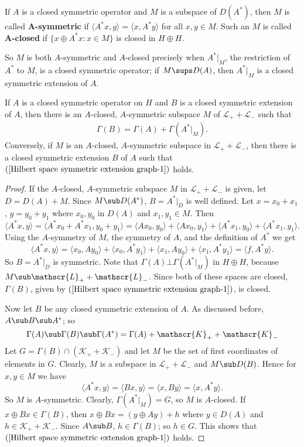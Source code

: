 \begin{definition}
If $A$ is a closed symmetric operator and $M$ is a subspace of $D(A^*)$, then $M$ is called \textbf{$\bm{A}$-symmetric} if $\langle A^*x,g\rangle=\langle x,A^*y\rangle$ for all $x,y\in M$. Such an $M$ is called \textbf{$\bm{A}$-closed} if $\{x\oplus A^*x:x\in M\}$ is closed in $H\oplus H$.
\end{definition}
So $M$ is both $A$-symmetric and $A$-closed precisely when $A^*|_M$, the restriction of $A^*$ to $M$, is a closed symmetric operator; if $M\sups D(A)$, then $A^*|_M$ is a closed symmetric extension of $A$.
\begin{proposition}\label{Hilbert space symmetric extension graph}
If $A$ is a closed symmetric operator on $H$ and $B$ is a closed symmetric extension of $A$, then there is an $A$-closed, $A$-symmetric subspace $M$ of $\mathscr{L}_++\mathscr{L}_-$ such that
\begin{align}\label{Hilbert space symmetric extension graph-1}
\Gamma(B)=\Gamma(A)+\Gamma(A^*|_{M}).
\end{align}
Conversely, if $M$ is an $A$-closed, $A$-symmetric subspace in $\mathscr{L}_++\mathscr{L}_-$, then there is a closed symmetric extension $B$ of $A$ such that $(\ref{Hilbert space symmetric extension graph-1})$ holds.
\end{proposition}
\begin{proof}
If the $A$-closed, $A$-symmetric subspace $M$ in $\mathscr{L}_++\mathscr{L}_-$ is given, let $D=D(A)+M$. Since $M\sub D(A^*)$, $B=A^*|_{D}$ is well defined. Let $x=x_0+x_1$, $y=y_0+y_1$ where $x_0,y_0$ in $D(A)$ and $x_1,y_1\in M$. Then
\[\langle A^*x,y\rangle=\langle A^*x_0+A^*x_1,y_0+y_1\rangle=\langle Ax_0,y_0\rangle+\langle Ax_0,y_1\rangle+\langle A^*x_1,y_0\rangle+\langle A^*x_1,y_1\rangle.\]
Using the $A$-symmetry of $M$, the symmetry of $A$, and the definition of $A^*$ we get
\[\langle A^*x,y\rangle=\langle x_0,Ay_0\rangle+\langle x_0,A^*y_1\rangle+\langle x_1,Ay_0\rangle+\langle x_1,A^*y_1\rangle=\langle f,A^*y\rangle.\]
So $B=A^*|_D$ is symmetric. Note that $\Gamma(A)\bot\Gamma(A^*|_M)$ in $H\oplus H$, because $M\sub\mathscr{L}_++\mathscr{L}_-$. Since both of these spaces are closed, $\Gamma(B)$, given by $(\ref{Hilbert space symmetric extension graph-1})$, is closed.\par
Now let $B$ be any closed symmetric extension of $A$. As discussed before, $A\sub B\sub A^*$; so
\[\Gamma(A)\sub\Gamma(B)\sub\Gamma(A^*)=\Gamma(A)+\mathscr{K}_++\mathscr{K}_-\]
Let $G=\Gamma(B)\cap(\mathscr{K}_++\mathscr{K}_-)$ and let $M$ be the set of first coordinates of elements in $G$. Clearly, $M$ is a subspace in $\mathscr{L}_++\mathscr{L}_-$ and $M\sub D(B)$. Hence for $x,y\in M$ we have
\[\langle A^*x,y\rangle=\langle Bx,y\rangle=\langle x,By\rangle=\langle x,A^*y\rangle.\]
So $M$ is $A$-symmetric. Clearly, $\Gamma(A^*|_M)=G$, so $M$ is $A$-closed. If $x\oplus Bx\in\Gamma(B)$, then $x\oplus Bx=(y\oplus Ay)+h$ where $y\in D(A)$ and $h\in\mathscr{K}_++\mathscr{K}_-$. Since $A\sub B$, $h\in\Gamma(B)$; so $h\in G$. This shows that $(\ref{Hilbert space symmetric extension graph-1})$ holds.
\end{proof}
